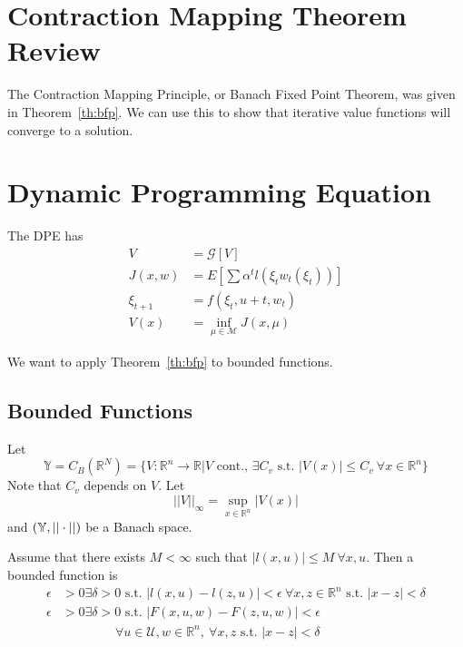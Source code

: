\mainmatter%
\setcounter{page}{1}

\lectureseries[\course]{\course}

\date{October 22, 2009}

\setaddress%

\setcounter{lecture}{7}
\setcounter{chapter}{7}


\section{Contraction Mapping Theorem Review}
The Contraction Mapping Principle, or Banach Fixed Point Theorem, was given in Theorem~\ref{th:bfp}.
We can use this to show that iterative value functions will converge to a solution.

\section{Dynamic Programming Equation}
The DPE has
\begin{align*}
V&=\mathcal{G}[V] \\
J(x,w) &= E[\sum\alpha^t l(\xi_t w_t(\xi_t))] \\
\xi_{t+1} &= f(\xi_t,u+t,w_t) \\
V(x) &= \inf_{\mu\in\mathcal{M}}J(x,\mu)
\end{align*}

We want to apply Theorem~\ref{th:bfp} to bounded functions.

\subsection{Bounded Functions}
Let
$$\mathbb{Y} = C_B(\mathbb{R}^N) = \{V:\mathbb{R}^n\to\mathbb{R} | V \text{~cont.,~} \exists C_v \text{~s.t.~} |V(x)|\leq C_v~\forall x\in\mathbb{R}^n\}$$
Note that $C_v$ depends on $V$.
Let
$$||V||_\infty = \sup_{x\in\mathbb{R}^n}|V(x)|$$
and $(\mathbb{Y},||\cdot||)$ be a Banach space.

Assume that there exists $M<\infty$ such that $|l(x,u)|\leq M~\forall x,u$.
Then a bounded function is
\begin{align*}
\epsilon&>0 \exists \delta>0 \text{~s.t.~} |l(x,u)-l(z,u)|<\epsilon~\forall x,z\in\mathbb{R}^n \text{~s.t.~} |x-z|<\delta \\
\epsilon&>0 \exists \delta>0 \text{~s.t.~} |F(x,u,w)-F(z,u,w)|<\epsilon \\
&\qquad\qquad~\forall u\in\mathcal{U},w\in\mathbb{R}^n,~\forall x,z \text{~s.t.~} |x-z|<\delta
\end{align*}

